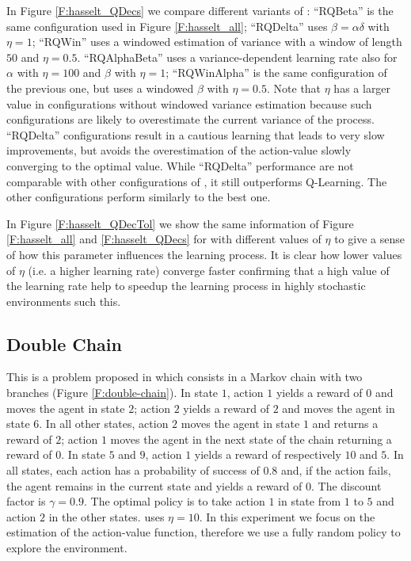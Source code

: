 \documentclass[conference]{IEEEtran}
\begin{document}
In Figure \ref{F:hasselt_QDecs} we compare different variants of \alg: ``RQBeta'' is the same configuration used in Figure \ref{F:hasselt_all}; ``RQDelta'' uses $\beta = \alpha \delta$ with $\eta = 1$; ``RQWin'' uses a windowed estimation of variance with a window of length $50$ and $\eta = 0.5$. ``RQAlphaBeta'' uses a variance-dependent learning rate also for $\alpha$ with $\eta = 100$ and $\beta$ with $\eta = 1$; ``RQWinAlpha'' is the same configuration of the previous one, but uses a windowed $\beta$ with $\eta = 0.5$. Note that $\eta$ has a larger value in configurations without windowed variance estimation because such configurations are likely to overestimate the current variance of the process. ``RQDelta'' configurations result in a cautious learning that leads to very slow improvements, but avoids the overestimation of the action-value slowly converging to the optimal value. While ``RQDelta'' performance are not comparable with other configurations of \alg, it still outperforms Q-Learning. The other configurations perform similarly to the best one.

In Figure \ref{F:hasselt_QDecTol} we show the same information of Figure \ref{F:hasselt_all} and \ref{F:hasselt_QDecs} for \alg with different values of $\eta$ to give a sense of how this parameter influences the learning process. It is clear how lower values of $\eta$ (i.e. a higher learning rate) converge faster confirming that a high value of the learning rate help to speedup the learning process in highly stochastic environments such this.

\subsection{Double Chain}
This is a problem proposed in \cite{Peters2010RelativeEP} which consists in a Markov chain with two branches (Figure \ref{F:double-chain}). In state $1$, action $1$ yields a reward of $0$ and moves the agent in state $2$; action $2$ yields a reward of $2$ and moves the agent in state $6$. In all other states, action $2$ moves the agent in state $1$ and returns a reward of $2$; action $1$ moves the agent in the next state of the chain returning a reward of $0$. In state $5$ and $9$, action $1$ yields a reward of respectively $10$ and $5$. In all states, each action has a probability of success of $0.8$ and, if the action fails, the agent remains in the current state and yields a reward of $0$. The discount factor is $\gamma = 0.9$. The optimal policy is to take action $1$ in state from $1$ to $5$ and action $2$ in the other states. \alg uses $\eta = 10$. In this experiment we focus on the estimation of the action-value function, therefore we use a fully random policy to explore the environment.
\end{document}
